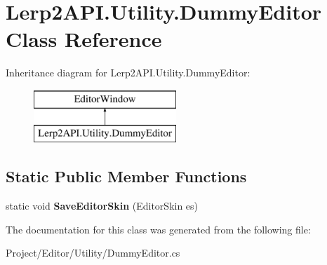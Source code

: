 \hypertarget{class_lerp2_a_p_i_1_1_utility_1_1_dummy_editor}{}\section{Lerp2\+A\+P\+I.\+Utility.\+Dummy\+Editor Class Reference}
\label{class_lerp2_a_p_i_1_1_utility_1_1_dummy_editor}
Inheritance diagram for Lerp2\+A\+P\+I.\+Utility.\+Dummy\+Editor\+:\begin{figure}[H]
\begin{center}
\leavevmode
\includegraphics[height=2.000000cm]{class_lerp2_a_p_i_1_1_utility_1_1_dummy_editor}
\end{center}
\end{figure}
\subsection*{Static Public Member Functions}
\begin{DoxyCompactItemize}
\item 
\mbox{\label{class_lerp2_a_p_i_1_1_utility_1_1_dummy_editor_abec36c47d42187ca176f1aa00265a30a}} 
static void {\bfseries Save\+Editor\+Skin} (Editor\+Skin es)
\end{DoxyCompactItemize}


The documentation for this class was generated from the following file\+:\begin{DoxyCompactItemize}
\item 
Project/\+Editor/\+Utility/Dummy\+Editor.\+cs\end{DoxyCompactItemize}

